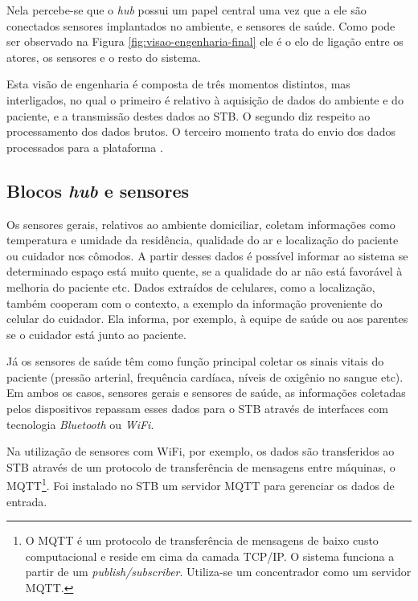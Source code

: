 Nela percebe-se que o \textit{hub} possui um papel central uma vez que a ele
são conectados sensores implantados no ambiente, e sensores de saúde. Como pode
ser observado na Figura \ref{fig:visao-engenharia-final} ele é o elo de ligação
entre os atores, os sensores e o resto do sistema.

Esta visão de engenharia é composta de três momentos distintos, mas interligados, no qual
o primeiro é relativo à aquisição de dados do ambiente e do paciente, e a
transmissão destes dados ao STB. O segundo diz respeito ao processamento dos
dados brutos. O terceiro momento trata do envio dos dados processados para a plataforma
\nextsaude[].


\subsection{Blocos \textit{hub} e sensores}

Os sensores gerais, relativos ao ambiente domiciliar, coletam informações como
temperatura e umidade da residência, qualidade do ar e localização do paciente
ou cuidador nos cômodos. A partir desses dados é possível informar ao sistema
se determinado espaço está muito quente, se a qualidade do ar não está
favorável à melhoria do paciente etc. Dados extraídos de celulares, como a
localização, também cooperam com o contexto, a exemplo da informação
proveniente do celular do cuidador. Ela informa, por exemplo, à equipe de saúde
ou aos parentes se o cuidador está junto ao paciente.

Já os sensores de saúde têm como função principal coletar os sinais vitais do
paciente (pressão arterial, frequência cardíaca, níveis de oxigênio no sangue
etc). Em ambos os casos, sensores gerais e sensores de saúde, as informações
coletadas pelos dispositivos repassam  esses dados para o STB através de
interfaces com tecnologia  \textit{Bluetooth} ou \textit{WiFi}.

Na utilização de sensores com WiFi, por exemplo, os dados são transferidos ao
STB através de um protocolo de transferência de mensagens entre máquinas, o
MQTT\footnote{O MQTT é um protocolo de transferência de mensagens de baixo
custo computacional e reside em cima da camada TCP/IP. O sistema funciona a
partir de um \textit{publish/subscriber}. Utiliza-se um concentrador como um
servidor MQTT.}.  Foi instalado no STB um servidor MQTT para gerenciar os dados
de entrada.

